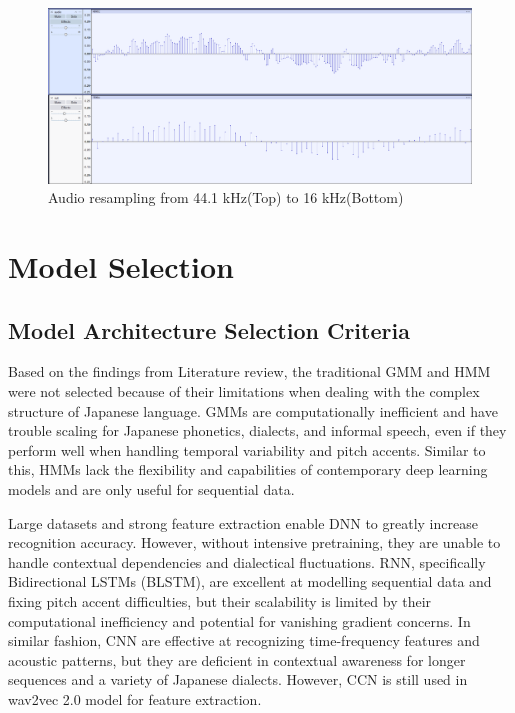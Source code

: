 \begin{figure}[H]
    \centering
    \includegraphics[width=1\textwidth]{mainmatter//images/bitrate.png}
    \caption{Audio resampling from 44.1 kHz(Top) to 16 kHz(Bottom)}
    \label{fig:resampling}
\end{figure}


\section{Model Selection}
\subsection{Model Architecture Selection Criteria}
Based on the findings from Literature review, the traditional GMM and HMM were not selected because of their limitations when dealing with the complex structure of Japanese language. GMMs are computationally inefficient and have trouble scaling for Japanese phonetics, dialects, and informal speech, even if they perform well when handling temporal variability and pitch accents. Similar to this, HMMs lack the flexibility and capabilities of contemporary deep learning models and are only useful for sequential data. 

Large datasets and strong feature extraction enable DNN to greatly increase recognition accuracy. However, without intensive pretraining, they are unable to handle contextual dependencies and dialectical fluctuations. RNN, specifically Bidirectional LSTMs (BLSTM), are excellent at modelling sequential data and fixing pitch accent difficulties, but their scalability is limited by their computational inefficiency and potential for vanishing gradient concerns. In similar fashion, CNN are effective at recognizing time-frequency features and acoustic patterns, but they are deficient in contextual awareness for longer sequences and a variety of Japanese dialects. However, CCN is still used in wav2vec 2.0 model for feature extraction. 

